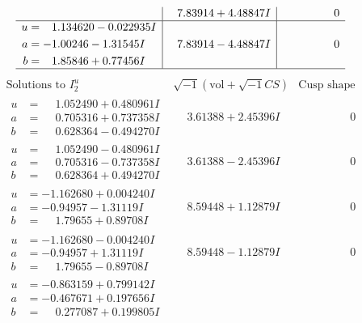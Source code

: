 \documentclass[1p]{elsarticle_modified}
\theoremstyle{definition}
\newcommand{\I}{\sqrt{-1}}
\begin{document}
$$\begin{array}{c|c|c}
 & \phantom{-}7.83914 + 4.48847 I & \phantom{-0.000000 } 0 \\ \hline\begin{aligned}
u &= \phantom{-}1.134620 - 0.022935 I \\
a &= -1.00246 - 1.31545 I \\
b &= \phantom{-}1.85846 + 0.77456 I\end{aligned}
 & \phantom{-}7.83914 - 4.48847 I & \phantom{-0.000000 } 0\\
 \hline 
 \end{array}$$\newpage$$\begin{array}{c|c|c}  
\text{Solutions to }I^u_{2}& \I (\text{vol} + \sqrt{-1}CS) & \text{Cusp shape}\\
 \hline 
\begin{aligned}
u &= \phantom{-}1.052490 + 0.480961 I \\
a &= \phantom{-}0.705316 + 0.737358 I \\
b &= \phantom{-}0.628364 - 0.494270 I\end{aligned}
 & \phantom{-}3.61388 + 2.45396 I & \phantom{-0.000000 } 0 \\ \hline\begin{aligned}
u &= \phantom{-}1.052490 - 0.480961 I \\
a &= \phantom{-}0.705316 - 0.737358 I \\
b &= \phantom{-}0.628364 + 0.494270 I\end{aligned}
 & \phantom{-}3.61388 - 2.45396 I & \phantom{-0.000000 } 0 \\ \hline\begin{aligned}
u &= -1.162680 + 0.004240 I \\
a &= -0.94957 - 1.31119 I \\
b &= \phantom{-}1.79655 + 0.89708 I\end{aligned}
 & \phantom{-}8.59448 + 1.12879 I & \phantom{-0.000000 } 0 \\ \hline\begin{aligned}
u &= -1.162680 - 0.004240 I \\
a &= -0.94957 + 1.31119 I \\
b &= \phantom{-}1.79655 - 0.89708 I\end{aligned}
 & \phantom{-}8.59448 - 1.12879 I & \phantom{-0.000000 } 0 \\ \hline\begin{aligned}
u &= -0.863159 + 0.799142 I \\
a &= -0.467671 + 0.197656 I \\
b &= \phantom{-}0.277087 + 0.199805 I\end{aligned}

\end{array}$$
\end{document}
